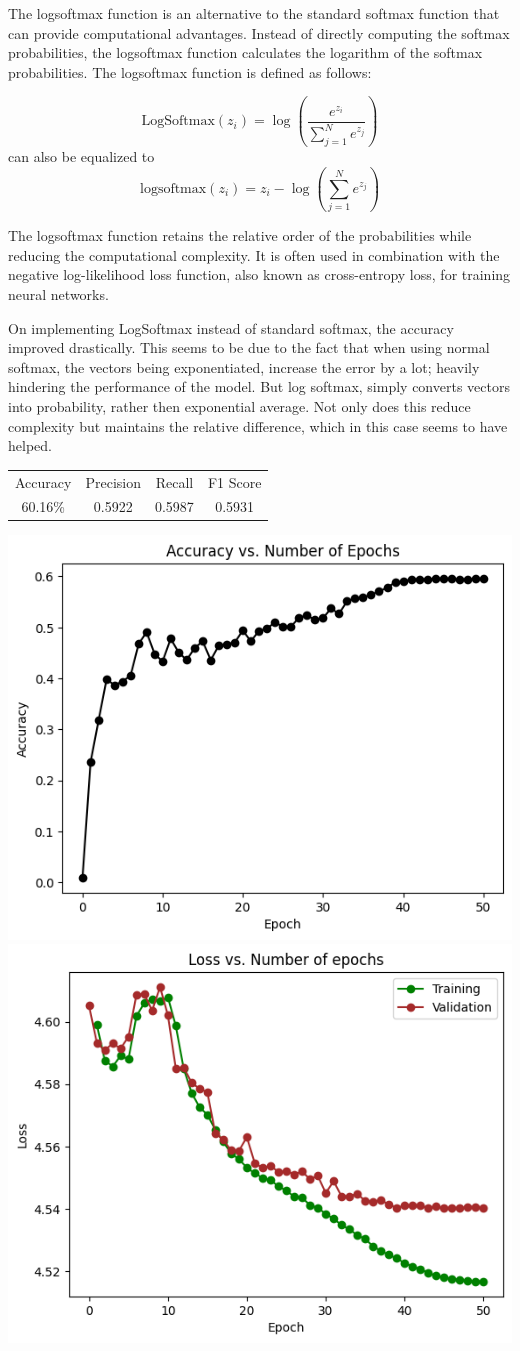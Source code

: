 \documentclass{article}
\begin{document}
The logsoftmax function is an alternative to the standard softmax function that can provide computational advantages. Instead of directly computing the softmax probabilities, the logsoftmax function calculates the logarithm of the softmax probabilities. The logsoftmax function is defined as follows:

\[
\text{LogSoftmax}(z_i) = \log\left(\frac{e^{z_i}}{\sum_{j=1}^N e^{z_j}}\right)
\]
can also be equalized to
\[
\text{logsoftmax}(z_i) = z_i - \log\left(\sum_{j=1}^{N}e^{z_j}\right)
\]

The logsoftmax function retains the relative order of the probabilities while reducing the computational complexity. It is often used in combination with the negative log-likelihood loss function, also known as cross-entropy loss, for training neural networks.

On implementing LogSoftmax instead of standard softmax, the accuracy improved drastically. This seems to be due to the fact that when using normal softmax, the vectors being exponentiated, increase the error by a lot; heavily hindering the performance of the model. But log softmax, simply converts vectors into probability, rather then exponential average. Not only does this reduce complexity but maintains the relative difference, which in this case seems to have helped.

\begin{center}
\begin{tabular}{ |c|c|c|c| } 
 \hline
 Accuracy & Precision & Recall & F1 Score \\ 
 60.16\% & 0.5922 & 0.5987 & 0.5931 \\
 \hline
\end{tabular}
\end{center}

        \includegraphics[width=0.5\linewidth]{images/LogSoftmax/logsoftmax-accepoch.png}
        \includegraphics[width=0.5\linewidth]{images/LogSoftmax/logsoftmax-lossepoch.png}
\end{document}
